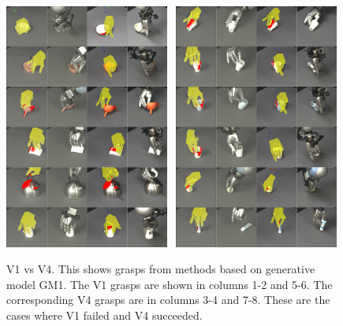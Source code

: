 \begin{figure}
\begin{center}
\includegraphics[width=0.48\textwidth]{plots/A2fA9s_1_vertical.png}~
\includegraphics[width=0.48\textwidth]{plots/A2fA9s_2_vertical.png}
\caption{V1 vs V4. This shows grasps from methods based on generative model GM1. The V1 grasps are shown in columns 1-2 and 5-6. The corresponding V4 grasps are in columns 3-4 and 7-8. These are the cases where V1 failed and V4 succeeded.\label{fig:v1fv4s}}
\end{center}
\end{figure}


